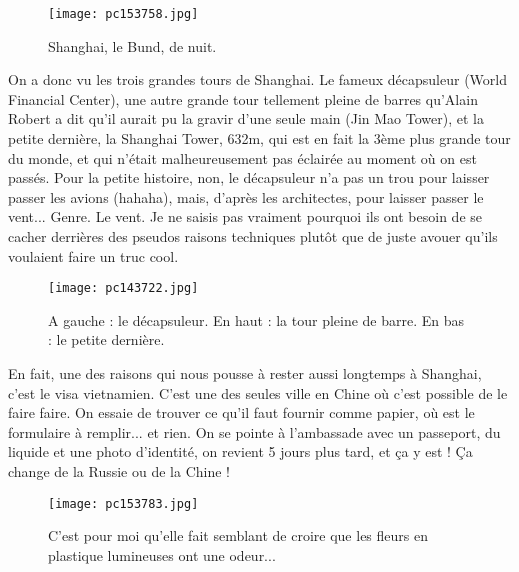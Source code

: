 \documentclass{book}
\begin{document}
\begin{figure}[h]
\centering
\texttt{[image: pc153758.jpg]}
\caption*{Shanghai, le Bund, de nuit.}
\end{figure}

On a donc vu les trois grandes tours de Shanghai. Le fameux décapsuleur (World Financial Center), une autre grande tour tellement pleine de barres qu'Alain Robert a dit qu'il aurait pu la gravir d'une seule main (Jin Mao Tower), et la petite dernière, la Shanghai Tower, 632m, qui est en fait la 3ème plus grande tour du monde, et qui n'était malheureusement pas éclairée au moment où on est passés. Pour la petite histoire, non, le décapsuleur n'a pas un trou pour laisser passer les avions (hahaha), mais, d'après les architectes, pour laisser passer le vent... Genre. Le vent. Je ne saisis pas vraiment pourquoi ils ont besoin de se cacher derrières des pseudos raisons techniques plutôt que de juste avouer qu'ils voulaient faire un truc cool.


\begin{figure}[h]
\centering
\texttt{[image: pc143722.jpg]}
\caption*{A gauche : le décapsuleur. En haut : la tour pleine de barre. En bas : le petite dernière.}
\end{figure}

En fait, une des raisons qui nous pousse à rester aussi longtemps à Shanghai, c'est le visa vietnamien. C'est une des seules ville en Chine où c'est possible de le faire faire. On essaie de trouver ce qu'il faut fournir comme papier, où est le formulaire à remplir... et rien. On se pointe à l'ambassade avec un passeport, du liquide et une photo d'identité, on revient 5 jours plus tard, et ça y est ! Ça change de la Russie ou de la Chine !


\begin{figure}[h]
\centering
\texttt{[image: pc153783.jpg]}
\caption*{C'est pour moi qu'elle fait semblant de croire que les fleurs en plastique lumineuses ont une odeur...}
\end{figure}
\end{document}
